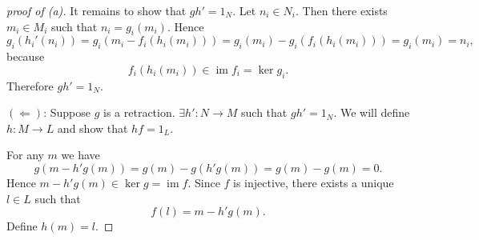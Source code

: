 \documentclass[11pt, a4paper]{report}
\begin{document}
\begin{proof}[proof of (a)]
    It remains to show that $gh'=1_N$. Let $n_i \in N_i$. Then there exists $m_i \in M_i$ such that $n_i = g_i(m_i)$. Hence
    \[
        g_i(h_i'(n_i)) = g_i(m_i-f_i(h_i(m_i))) = g_i(m_i)-g_i(f_i(h_i(m_i))) = g_i(m_i)=n_i,
    \]
    because
    \[
        f_i(h_i(m_i)) \in \operatorname{im}f_i = \operatorname{ker}g_i.
    \]
    Therefore $gh' = 1_N$.

    $(\Leftarrow )$:
    Suppose $g$ is a retraction. $\exists h': N\to M$ such that $gh'=1_N$. We will define $h: M\to L$ and show that $hf=1_L$.

    For any $m$ we have
    \[
        g(m-h'g(m))=g(m)-g(h'g(m))=g(m)-g(m)=0.
    \]
    Hence $m-h'g(m) \in \operatorname{ker}g = \operatorname{im}f$. Since $f$ is injective, there exists a unique $l \in L$ such that
    \[
        f(l)=m-h'g(m).
    \]
    Define $h(m)=l$.


\end{proof}
\end{document}

